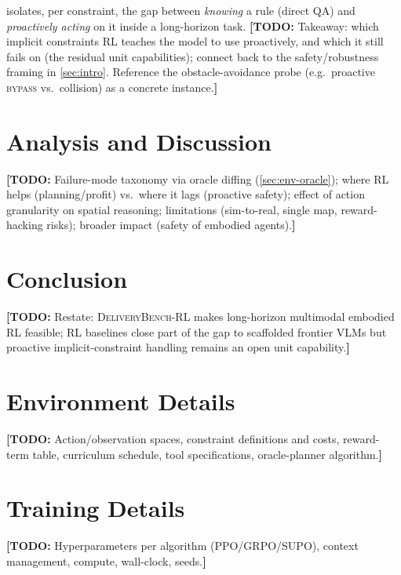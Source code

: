 \documentclass[11pt]{article}
\newcommand{\ours}{\textsc{DeliveryBench-RL}\xspace}
\newcommand{\TODO}[1]{{\color{red}\textbf{[TODO:} #1\textbf{]}}}
\begin{document}
 isolates, per constraint, the gap between \emph{knowing} a rule
(direct QA) and \emph{proactively acting} on it inside a long-horizon task.
\TODO{Takeaway: which implicit constraints RL teaches the model to use
proactively, and which it still fails on (the residual unit capabilities);
connect back to the safety/robustness framing in \cref{sec:intro}. Reference
the obstacle-avoidance probe (e.g.\ proactive \textsc{bypass} vs.\ collision)
as a concrete instance.}

\section{Analysis and Discussion}
\label{sec:analysis}
\TODO{Failure-mode taxonomy via oracle diffing (\cref{sec:env-oracle}); where RL
helps (planning/profit) vs.\ where it lags (proactive safety); effect of action
granularity on spatial reasoning; limitations (sim-to-real, single map,
reward-hacking risks); broader impact (safety of embodied agents).}

\section{Conclusion}
\label{sec:conclusion}
\TODO{Restate: \ours makes long-horizon multimodal embodied RL feasible; RL
baselines close part of the gap to scaffolded frontier VLMs but proactive
implicit-constraint handling remains an open unit capability.}

\appendix
\section{Environment Details}
\TODO{Action/observation spaces, constraint definitions and costs, reward-term
table, curriculum schedule, tool specifications, oracle-planner algorithm.}

\section{Training Details}
\TODO{Hyperparameters per algorithm (PPO/GRPO/SUPO), context management,
compute, wall-clock, seeds.}

% 
% 
\end{document}
